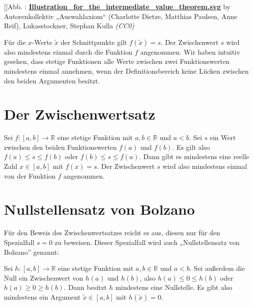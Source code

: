 \documentclass[fontsize=9pt,
               parskip=half-,
               DIV=14,
               listof=chapterentry,
               tocflat]{scrbook}
\newcounter{imagelabel}
\begin{document}
[]{Abb. : \protect\href{https://commons.wikimedia.org/wiki/File:Illustration_for_the_intermediate_value_theorem.svg}{\textbf{Illustration\allowbreak\_for\allowbreak\_the\allowbreak\_intermediate\allowbreak\_value\allowbreak\_theorem.svg}} by Autorenkollektiv „Auswahlaxiom“ (Charlotte Dietze, Matthias Paulsen, Anne Reif), Lukasstockner, Stephan Kulla \textit{(CC0)}}\begin{center}
\end{center}

Für die $x$-Werte ${\tilde {x}}$ der Schnittpunkte gilt $f({\tilde {x}})=s$. Der Zwischenwert $s$ wird also mindestens einmal durch die Funktion $f$ angenommen. Wir haben intuitiv gesehen, dass stetige Funktionen alle Werte zwischen zwei Funktionswerten mindestens einmal annehmen, wenn der Definitionsbereich keine Lücken zwischen den beiden Argumenten besitzt.

\section{Der Zwischenwertsatz}

\begin{theorem*}[Zwischenwertsatz]
Sei $f:[a,b]\to \mathbb {R} $ eine stetige Funktion mit $a,b\in \mathbb {R} $ und $a<b$. Sei $s$ ein Wert zwischen den beiden Funktionswerten $f(a)$ und $f(b)$. Es gilt also $f(a)\leq s\leq f(b)$ oder $f(b)\leq s\leq f(a)$. Dann gibt es mindestens eine reelle Zahl $x\in [a,b]$ mit $f(x)=s$. Der Zwischenwert $s$ wird also mindestens einmal von der Funktion $f$ angenommen.

\end{theorem*}

\section{Nullstellensatz von Bolzano}

Für den Beweis des Zwischenwertsatzes reicht es aus, diesen nur für den Spezialfall $s=0$ zu beweisen. Dieser Spezialfall wird auch „Nullstellensatz von Bolzano” genannt:

\begin{theorem*}
Sei $h:[a,b]\to \mathbb {R} $ eine stetige Funktion mit $a,b\in \mathbb {R} $ und $a<b$. Sei außerdem die Null ein Zwischenwert von $h(a)$ und $h(b)$, also $h(a)\leq 0\leq h(b)$ oder $h(a)\geq 0\geq h(b)$. Dann besitzt $h$ mindestens eine Nullstelle. Es gibt also mindestens ein Argument ${\tilde {x}}\in [a,b]$ mit $h({\tilde {x}})=0$.

\end{theorem*}
\end{document}
